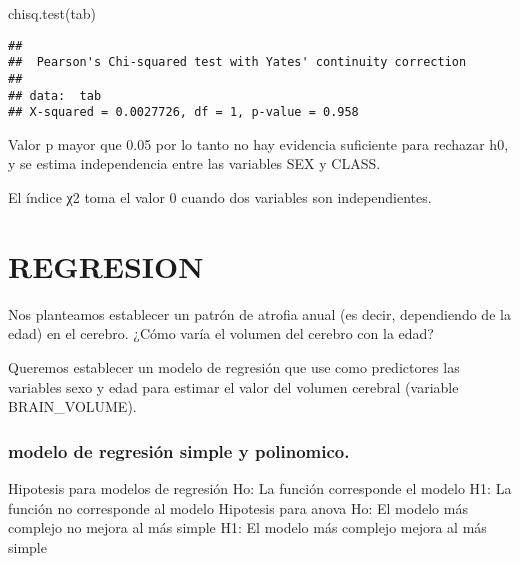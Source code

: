 \documentclass[
]{article}
\newenvironment{Shaded}{\begin{snugshade}}{\end{snugshade}}
\newcommand{\FunctionTok}[1]{\textcolor[rgb]{0.00,0.00,0.00}{#1}}
\newcommand{\NormalTok}[1]{#1}
\begin{document}
\begin{Shaded}
\begin{Highlighting}[]
\FunctionTok{chisq.test}\NormalTok{(tab)}
\end{Highlighting}
\end{Shaded}

\begin{verbatim}
## 
##  Pearson's Chi-squared test with Yates' continuity correction
## 
## data:  tab
## X-squared = 0.0027726, df = 1, p-value = 0.958
\end{verbatim}

Valor p mayor que 0.05 por lo tanto no hay evidencia suficiente para
rechazar h0, y se estima independencia entre las variables SEX y CLASS.

El índice χ2 toma el valor 0 cuando dos variables son independientes.

\hypertarget{regresion}{%
\section{REGRESION}\label{regresion}}

Nos planteamos establecer un patrón de atrofia anual (es decir,
dependiendo de la edad) en el cerebro. ¿Cómo varía el volumen del
cerebro con la edad?

Queremos establecer un modelo de regresión que use como predictores las
variables sexo y edad para estimar el valor del volumen cerebral
(variable BRAIN\_VOLUME).

\hypertarget{modelo-de-regresiuxf3n-simple-y-polinomico.}{%
\subsubsection{modelo de regresión simple y
polinomico.}\label{modelo-de-regresiuxf3n-simple-y-polinomico.}}

Hipotesis para modelos de regresión Ho: La función corresponde el modelo
H1: La función no corresponde al modelo Hipotesis para anova Ho: El
modelo más complejo no mejora al más simple H1: El modelo más complejo
mejora al más simple
\end{document}

